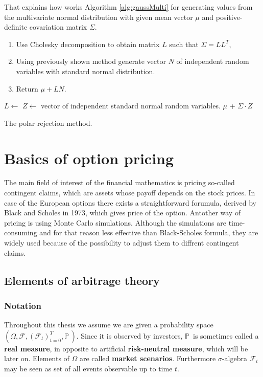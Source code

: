 \documentclass[a4paper,11pt, twoside]{book}
\theoremstyle{definition}
\theoremstyle{remark}
\def\P{{\mathbb{P}}\,}
\begin{document}
That explains how works Algorithm \ref{alg:gaussMulti} for generating values from the multivariate normal distribution with given mean vector $\mu$ and positive-definite covariation matrix $\Sigma$. 
\begin{enumerate}
 \item Use Cholesky decomposition to obtain matrix $L$ such that $\Sigma = LL^T$,
 \item Using previously shown method generate vector $N$ of independent random variables with standard normal distribution.
 \item Return $\mu + LN$.
\end{enumerate}
\begin{algorithm}[!ht]
 \begin{algorithmic}[1]
    \State $L \gets $ 
    \State $Z \gets $ vector of independent standard normal random variables.
    \State {}
    \State \Return $\mu$ + $\Sigma \cdot Z$
  \EndFunction
 \end{algorithmic}
 \caption{The polar rejection method.}
 \label{alg:gaussMulti}
\end{algorithm}


\chapter{Basics of option pricing}
The main field of interest of the financial mathematics is pricing so-called contingent claims, which are assets whose payoff depends on the stock prices. In case of the European options there exists a straightforward forumula, derived by Black and Scholes in 1973, which gives price of the option. Antother way of pricing is using Monte Carlo simulations.
Although the simulations are time-consuming and for that reason less effective than Black-Scholes formula, they are widely used because of the possibility to adjust them to diffrent contingent claims. 

\section{Elements of arbitrage theory}

\subsection{Notation}
Throughout this thesis we assume we are given a probability space $(\Omega, \mathcal{F}, (\mathcal{F}_t)_{t=0}^T, \P)$. Since it is observed by investors, $\P$ is sometimes called a \textbf{real measure}, in opposite to artificial \textbf{risk-neutral measure}, which will be later on. Elements of $\Omega$ are called \textbf{market scenarios}.
Furthermore $\sigma$-algebra $\mathcal{F}_t$ may be seen as set of all events observable up to time $t$.
\end{document}
